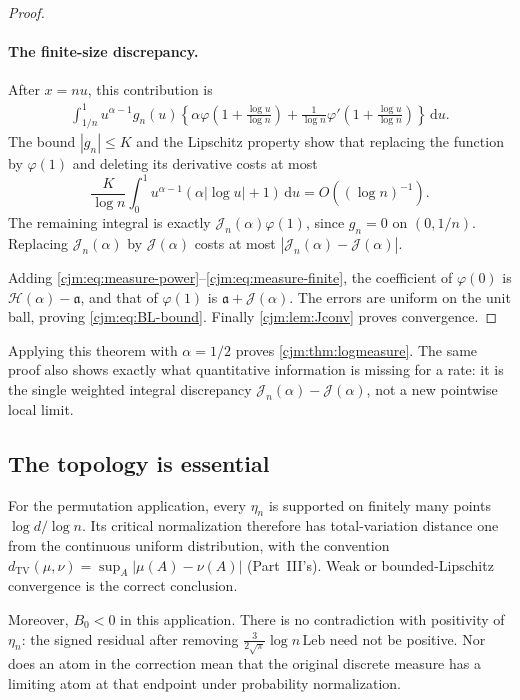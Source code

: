 \documentclass[11pt,a4paper]{article}
\theoremstyle{definition}\newaliascnt{definition}{theorem}
\theoremstyle{remark}\newaliascnt{remark}{theorem}
\newcommand{\dd}{\mathrm d}
\newcommand{\ljTV}{d_{\mathrm{TV}}}
\newcommand{\cjLeb}{\mathrm{Leb}}
\begin{document}
\begin{proof}
\paragraph{The finite-size discrepancy.}
After $x=nu$, this contribution is
\begin{align}
 \int_{1/n}^1u^{\alpha-1}g_n(u)
 \left\{\alpha\varphi\left(1+\frac{\log u}{\log n}\right)
 +\frac1{\log n}\varphi'\left(1+\frac{\log u}{\log n}\right)\right\}\,\dd u.
 \label{cjm:eq:measure-finite}
\end{align}
The bound $|g_n|\le K$ and the Lipschitz property show that replacing the
function by $\varphi(1)$ and deleting its derivative costs at most
\[
 \frac K{\log n}\int_0^1u^{\alpha-1}(\alpha|\log u|+1)\,\dd u=O((\log n)^{-1}).
\]
The remaining integral is exactly $\mathcal J_n(\alpha)\varphi(1)$, since
$g_n=0$ on $(0,1/n)$. Replacing $\mathcal J_n(\alpha)$ by $\mathcal J(\alpha)$
costs at most $|\mathcal J_n(\alpha)-\mathcal J(\alpha)|$.

Adding \eqref{cjm:eq:measure-power}--\eqref{cjm:eq:measure-finite}, the
coefficient of $\varphi(0)$ is $\mathcal H(\alpha)-\mathfrak a$, and that of
$\varphi(1)$ is $\mathfrak a+\mathcal J(\alpha)$. The errors are uniform on
the unit ball, proving \eqref{cjm:eq:BL-bound}. Finally \cref{cjm:lem:Jconv}
proves convergence.
\end{proof}

Applying this theorem with $\alpha=1/2$ proves \cref{cjm:thm:logmeasure}.
The same proof also shows exactly what quantitative information is missing
for a rate: it is the single weighted integral discrepancy
$\mathcal J_n(\alpha)-\mathcal J(\alpha)$, not a new pointwise local limit.

\subsection{The topology is essential}
For the permutation application, every $\eta_n$ is supported on finitely
many points $\log d/\log n$. Its critical normalization therefore has
total-variation distance one from the continuous uniform distribution,
with the convention $\ljTV(\mu,\nu)=\sup_A|\mu(A)-\nu(A)|$ (Part~III's).
Weak or bounded-Lipschitz convergence is the correct conclusion.

Moreover, $B_0<0$ in this application. There is no contradiction with
positivity of $\eta_n$: the signed residual after removing
$\frac3{2\sqrt\pi}\log n\,\cjLeb$ need not be positive. Nor does an atom in
the correction mean that the original discrete measure has a limiting atom
at that endpoint under probability normalization.
\end{document}
